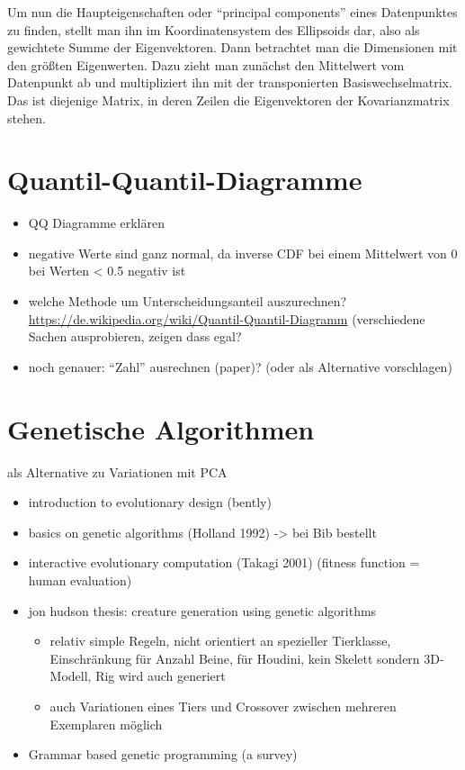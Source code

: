  Um nun die Haupteigenschaften oder "`principal components"' eines Datenpunktes zu finden, stellt man ihn im Koordinatensystem des Ellipsoids dar, also als gewichtete Summe der Eigenvektoren. Dann betrachtet man die Dimensionen mit den größten Eigenwerten. Dazu zieht man zunächst den Mittelwert vom Datenpunkt ab und multipliziert ihn mit der transponierten Basiswechselmatrix. Das ist diejenige Matrix, in deren Zeilen die Eigenvektoren der Kovarianzmatrix stehen.

 
\section{Quantil-Quantil-Diagramme} 
\label{qqdiagrams}

 \begin{itemize}
  \item QQ Diagramme erklären
  \item negative Werte sind ganz normal, da inverse CDF bei einem Mittelwert von 0 bei Werten < 0.5 negativ ist
  \item welche Methode um Unterscheidungsanteil auszurechnen? \url{https://de.wikipedia.org/wiki/Quantil-Quantil-Diagramm} (verschiedene Sachen ausprobieren, zeigen dass egal?
  \item noch genauer: "`Zahl"' ausrechnen (paper)? (oder als Alternative vorschlagen)
 \end{itemize}


\section{Genetische Algorithmen}

als Alternative zu Variationen mit PCA

\begin{itemize}
 \item introduction to evolutionary design (bently)
 \item basics on genetic algorithms (Holland 1992) -> bei Bib bestellt
 \item interactive evolutionary computation (Takagi 2001) (fitness function = human evaluation)
 \item jon hudson thesis: creature generation using genetic algorithms \cite{JonHudson}
   \begin{itemize}
    \item relativ simple Regeln, nicht orientiert an spezieller Tierklasse, Einschränkung für Anzahl Beine, für Houdini, kein Skelett sondern 3D-Modell, Rig wird auch generiert
    \item auch Variationen eines Tiers und Crossover zwischen mehreren Exemplaren möglich
   \end{itemize}
  \item Grammar based genetic programming (a survey) 
\end{itemize}


